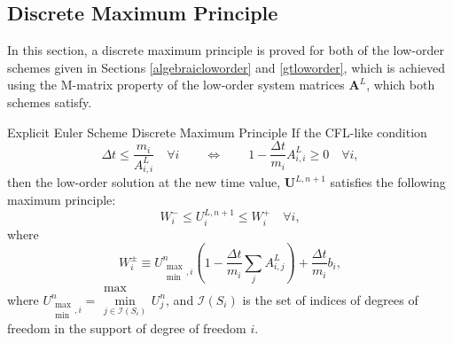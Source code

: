 \subsection{Discrete Maximum Principle}\label{DMP}
In this section, a discrete maximum principle is proved for both of the low-order
schemes given in Sections \ref{algebraicloworder} and \ref{gtloworder}, which is
achieved using the M-matrix property of the low-order system matrices
$\mathbf{A}^L$, which both schemes satisfy.
\begin{theorem}[label={exloworderDMP}]{Explicit Euler Scheme Discrete Maximum Principle}
If the CFL-like condition
\begin{equation}\label{ex_CFL}
   \Delta t \leq \frac{m_i}{A_{i,i}^L}\quad\forall i
   \qquad\Longleftrightarrow\qquad
   1 - \frac{\Delta t}{m_i}A_{i,i}^L \geq 0\quad\forall i,
\end{equation}
then the low-order solution at the new time value, $\mathbf{U}^{L,n+1}$ satisfies the
following maximum principle:
\begin{equation}\label{explicit_max_principle}
   W_i^-\leq U_i^{L,n+1}\leq W_i^+\quad\forall i,
\end{equation}
where
\begin{equation}\label{ex_bounds}
   W_i^\pm\equiv U_{\substack{\max\\\min},i}^n\left(1-\frac{\Delta t}{m_i}
      \sum\limits_j A^L_{i,j}\right)
      + \frac{\Delta t}{m_i}b_i,
\end{equation}
where $U_{\substack{\max\\\min},i}^n =
\substack{\max\\\min\limits_{j\in \mathcal{I}(S_i)}}U_j^n$,
and $\mathcal{I}(S_i)$ is the set of indices of degrees of freedom in the
support of degree of freedom $i$.
\end{theorem}

